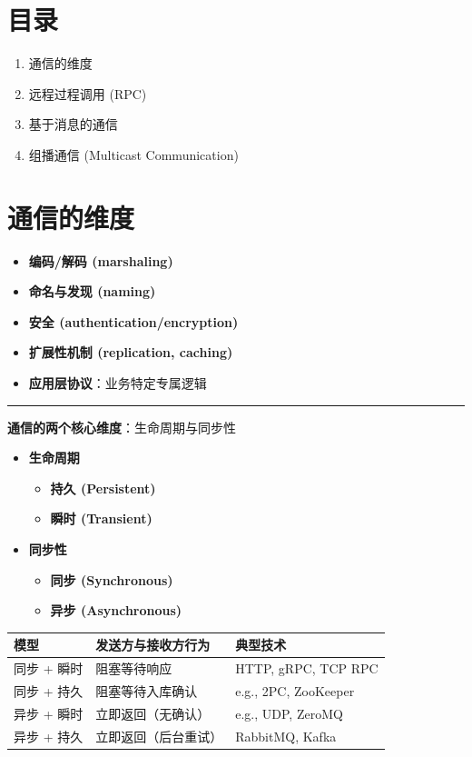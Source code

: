 \section{目录}

\begin{enumerate}
\item 通信的维度
\item 远程过程调用 (RPC)
\item 基于消息的通信
\item 组播通信 (Multicast Communication)
\end{enumerate}

\section{通信的维度}

\begin{itemize}
\item \textbf{编码/解码 (marshaling)}
\item \textbf{命名与发现 (naming)}
\item \textbf{安全 (authentication/encryption)}
\item \textbf{扩展性机制 (replication, caching)}
\item \textbf{应用层协议}：业务特定专属逻辑
\end{itemize}

\bigskip
\hrule
\bigskip

\textbf{通信的两个核心维度}：生命周期与同步性

\begin{itemize}
\item \textbf{生命周期}
  \begin{itemize}
  \item \textbf{持久 (Persistent)}
  \item \textbf{瞬时 (Transient)}
  \end{itemize}
\item \textbf{同步性}
  \begin{itemize}
  \item \textbf{同步 (Synchronous)}
  \item \textbf{异步 (Asynchronous)}
  \end{itemize}
\end{itemize}

\begin{table}[htbp]
\centering
\begin{tabular}{@{}lll@{}}
\toprule
模型 & 发送方与接收方行为 & 典型技术 \\
\midrule
同步 + 瞬时 & 阻塞等待响应 & HTTP, gRPC, TCP RPC \\
同步 + 持久 & 阻塞等待入库确认 & e.g., 2PC, ZooKeeper \\
异步 + 瞬时 & 立即返回（无确认） & e.g., UDP, ZeroMQ \\
异步 + 持久 & 立即返回（后台重试） & RabbitMQ, Kafka \\
\bottomrule
\end{tabular}
\end{table}

